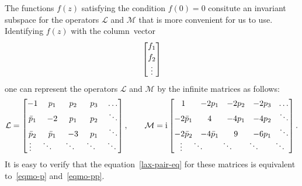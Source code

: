 \documentclass[pdftex]{sigma}
\numberwithin{equation}{section}
\begin{document}
The functions $f(z)$ satisfying the condition $f(0)=0$ consitute an invariant subspace for the operators
$\mathcal L$ and $\mathcal M$ that is more convenient for us to use.
Identifying $f(z)$ with the column~vector
\begin{gather*}
\begin{bmatrix}
f_1
\\[2pt]
f_2
\\[6pt]
\raisebox{0pt}[0pt][2pt]{\vdots}
\end{bmatrix}
\end{gather*}
one can represent the operators $\mathcal L$ and $\mathcal M$ by the inf\/inite matrices as follows:
\begin{gather*}
\mathcal L=
\begin{bmatrix}
-1&p_1&p_2&p_3&\hspace{-1pt}\ldots
\\
\bar{p}_1&-2&p_1&p_2&\ddots
\\
\bar{p}_2&\bar{p}_1&-3&p_1&\ddots
\\[-2pt]
\raisebox{-1pt}{\vdots}\hspace{12pt}\ddots\hspace{-20pt}&\hspace{24pt}\ddots\hspace{-20pt}&\hspace{24pt}
\ddots\hspace{-20pt}&\hspace{24pt}\ddots\hspace{-20pt}
\end{bmatrix}
,
\qquad
\mathcal M=\mathrm{i}
\begin{bmatrix}
1&-2p_1&-2p_2&-2p_3&\hspace{-1pt}\ldots
\\
-2\bar{p}_1&4&-4p_1&-4p_2&\ddots
\\
-2\bar{p}_2&-4\bar{p}_1&9&-6p_1&\ddots
\\[-2pt]
\raisebox{-1pt}{\vdots}\hspace{12pt}\ddots\hspace{-20pt}&\hspace{24pt}\ddots\hspace{-20pt}&\hspace{24pt}
\ddots\hspace{-20pt}&\hspace{24pt}\ddots\hspace{-20pt}
\end{bmatrix}
.
\end{gather*}
It is easy to verify that the equation~\eqref{lax-pair-eq} for these matrices is equivalent
to~\eqref{eqmo-p} and~\eqref{eqmo-pp}.
\end{document}
